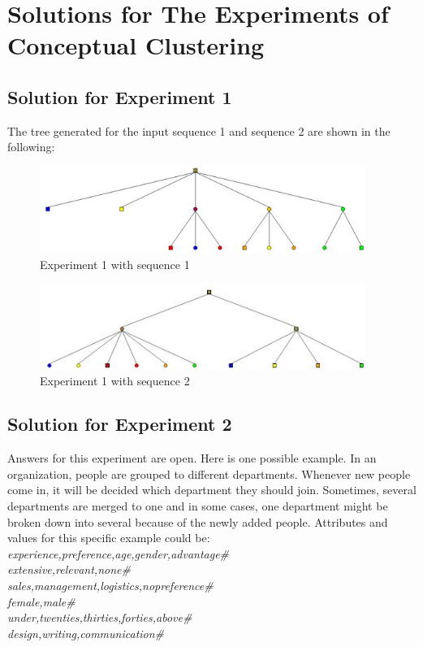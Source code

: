 \section{Solutions for The Experiments of Conceptual Clustering}
\subsection{Solution for Experiment 1}
The tree generated for the input sequence 1 and sequence 2 are shown in the following:
\begin{figure}[h!]
    \centering
    \includegraphics[width=300pt]{../images/experiment1_seq1_9.jpg}
    \caption{Experiment 1 with sequence 1}
    \label{Fig:experiment1_seq1}
\end{figure}

\begin{figure}[h!]
    \centering
    \includegraphics[width=300pt]{../images/experiment1_seq2_9.jpg}
    \caption{Experiment 1 with sequence 2}
    \label{Fig:experiment1_seq2}
\end{figure}

\subsection{Solution for Experiment 2}
Answers for this experiment are open. Here is one possible example. In an organization, people are grouped to different departments. Whenever new people come in, it will be decided which department they should join. Sometimes, several departments are merged to one and in some cases, one department might be broken down into several because of the newly added people. Attributes and values for this specific example could be:\\
\emph{experience,preference,age,gender,advantage\#\\
 extensive,relevant,none\#\\
 sales,management,logistics,nopreference\#\\
 female,male\#\\
 under,twenties,thirties,forties,above\#\\
 design,writing,communication\#\\} 

